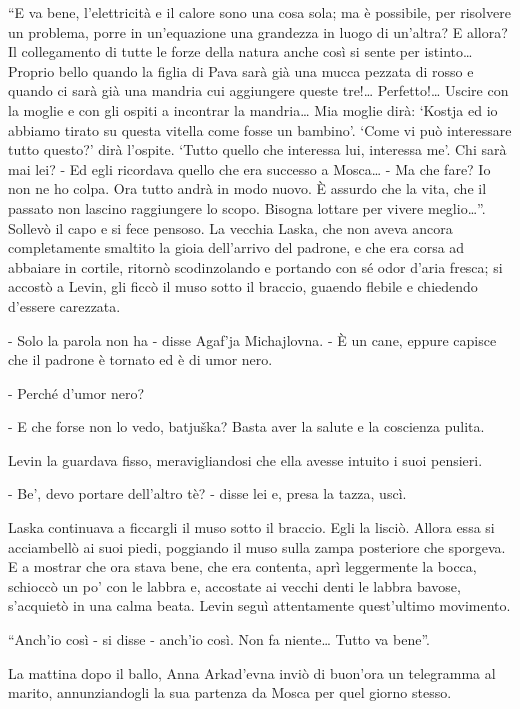 ``E va bene, l'elettricità e il calore sono una cosa sola; ma è possibile, per risolvere un problema, porre in un'equazione una grandezza in luogo di un'altra? E allora? Il collegamento di tutte le forze della natura anche così si sente per istinto\ldots{} Proprio bello quando la figlia di Pava sarà già una mucca pezzata di rosso e quando ci sarà già una mandria cui aggiungere queste tre!\ldots{} Perfetto!\ldots{} Uscire con la moglie e con gli ospiti a incontrar la mandria\ldots{} Mia moglie dirà: `Kostja ed io abbiamo tirato su questa vitella come fosse un bambino'. `Come vi può interessare tutto questo?' dirà l'ospite. `Tutto quello che interessa lui, interessa me'. Chi sarà mai lei? - Ed egli ricordava quello che era successo a Mosca\ldots{} - Ma che fare? Io non ne ho colpa. Ora tutto andrà in modo nuovo. È assurdo che la vita, che il passato non lascino raggiungere lo scopo. Bisogna lottare per vivere meglio\ldots{}''. Sollevò il capo e si fece pensoso. La vecchia Laska, che non aveva ancora completamente smaltito la gioia dell'arrivo del padrone, e che era corsa ad abbaiare in cortile, ritornò scodinzolando e portando con sé odor d'aria fresca; si accostò a Levin, gli ficcò il muso sotto il braccio, guaendo flebile e chiedendo d'essere carezzata. 

- Solo la parola non ha - disse Agaf'ja Michajlovna. - È un cane, eppure capisce che il padrone è tornato ed è di umor nero. 

- Perché d'umor nero? 

- E che forse non lo vedo, batjuška? Basta aver la salute e la coscienza pulita. 

Levin la guardava fisso, meravigliandosi che ella avesse intuito i suoi pensieri. 

- Be', devo portare dell'altro tè? - disse lei e, presa la tazza, uscì. 

Laska continuava a ficcargli il muso sotto il braccio. Egli la lisciò. Allora essa si acciambellò ai suoi piedi, poggiando il muso sulla zampa posteriore che sporgeva. E a mostrar che ora stava bene, che era contenta, aprì leggermente la bocca, schioccò un po' con le labbra e, accostate ai vecchi denti le labbra bavose, s'acquietò in una calma beata. Levin seguì attentamente quest'ultimo movimento. 

``Anch'io così - si disse - anch'io così. Non fa niente\ldots{} Tutto va bene''. 

\label{xxviii} 

La mattina dopo il ballo, Anna Arkad'evna inviò di buon'ora un telegramma al marito, annunziandogli la sua partenza da Mosca per quel giorno stesso. 

